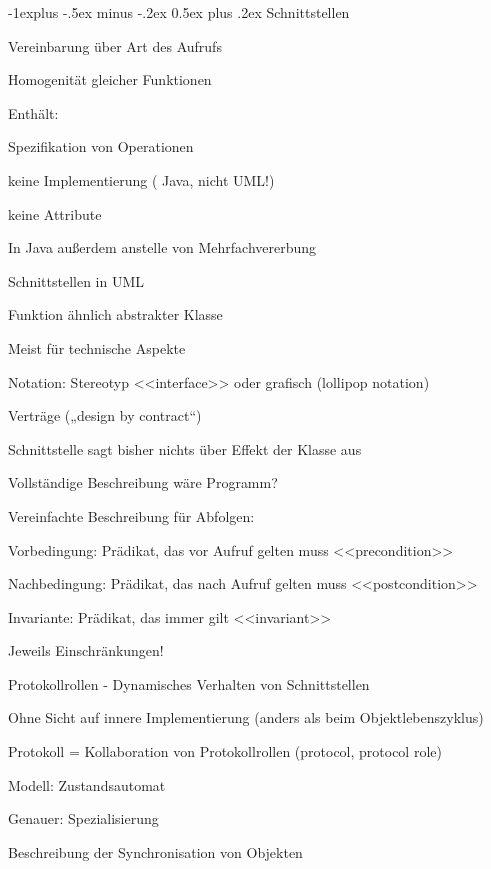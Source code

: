 \documentclass[a4paper]{article}
\makeatletter
\renewcommand{\subsection}{\@startsection{subsection}{2}{0mm}%
                                {-1explus -.5ex minus -.2ex}%
                                {0.5ex plus .2ex}%
                                {\normalfont\normalsize\bfseries}}
\makeatother
\begin{document}
\begin{multicols}{3}
  \subsection{Schnittstellen}
  \begin{itemize*}
    \item Vereinbarung über Art des Aufrufs
    \begin{itemize*}
      \item Homogenität gleicher Funktionen
      \item Enthält:
      \item Spezifikation von Operationen
      \item keine Implementierung ( Java, nicht UML!)
      \item keine Attribute
      \item In Java außerdem anstelle von Mehrfachvererbung
    \end{itemize*}
    \item Schnittstellen in UML
    \begin{itemize*}
      \item Funktion ähnlich abstrakter Klasse
      \item Meist für technische Aspekte
      \item Notation: Stereotyp <<interface>> oder grafisch (lollipop notation)
    \end{itemize*}
    \item Verträge („design by contract“)
    \begin{itemize*}
      \item Schnittstelle sagt bisher nichts über Effekt der Klasse aus
      \item Vollständige Beschreibung wäre Programm?
      \item Vereinfachte Beschreibung für Abfolgen:
      \item Vorbedingung: Prädikat, das vor Aufruf gelten muss <<precondition>>
      \item Nachbedingung: Prädikat, das nach Aufruf gelten muss <<postcondition>>
      \item Invariante: Prädikat, das immer gilt <<invariant>>
      \item Jeweils Einschränkungen!
    \end{itemize*}
  \end{itemize*}

  Protokollrollen - Dynamisches Verhalten von Schnittstellen
  \begin{itemize*}
    \item Ohne Sicht auf innere Implementierung (anders als beim Objektlebenszyklus)
    \item Protokoll = Kollaboration von Protokollrollen (protocol, protocol role)
    \item Modell: Zustandsautomat
    \begin{itemize*}
      \item Genauer: Spezialisierung
      \item Beschreibung der Synchronisation von Objekten
    \end{itemize*}
  \end{itemize*}


\end{multicols}
\end{document}

